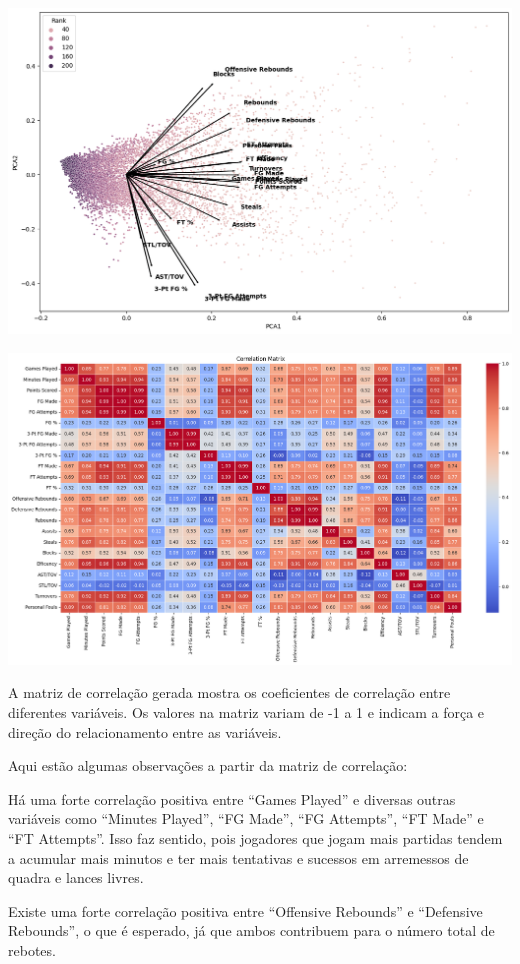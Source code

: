 \documentclass[
]{book}
\begin{document}
\includegraphics{imagens/4.png}

\includegraphics{imagens/5.png}

A matriz de correlação gerada mostra os coeficientes de correlação entre diferentes variáveis. Os valores na matriz variam de -1 a 1 e indicam a força e direção do relacionamento entre as variáveis.

Aqui estão algumas observações a partir da matriz de correlação:

Há uma forte correlação positiva entre ``Games Played'' e diversas outras variáveis como ``Minutes Played'', ``FG Made'', ``FG Attempts'', ``FT Made'' e ``FT Attempts''. Isso faz sentido, pois jogadores que jogam mais partidas tendem a acumular mais minutos e ter mais tentativas e sucessos em arremessos de quadra e lances livres.

Existe uma forte correlação positiva entre ``Offensive Rebounds'' e ``Defensive Rebounds'', o que é esperado, já que ambos contribuem para o número total de rebotes.
\end{document}
